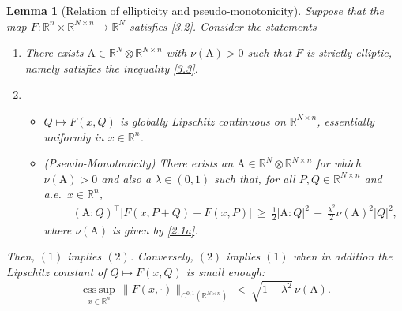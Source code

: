 \documentclass{amsart}
\newtheorem{lemma}[theorem]{Lemma}
\theoremstyle{definition}
\numberwithin{equation}{section}
\begin{document}
\begin{lemma}[Relation of ellipticity and pseudo-monotonicity] \label{pr1} Suppose that the map $F : {\mathbb{R}}^n {\times} {\mathbb{R}}^{N{\times} n}{\longrightarrow} {\mathbb{R}}^N$ satisfies \eqref{3.2}.
Consider the statements
\begin{enumerate}

\item There exists ${\textrm{A}} \in {\mathbb{R}}^N {\otimes} {\mathbb{R}}^{N{\times} n}$ with $\nu({\textrm{A}})>0$ such that $F$ is strictly elliptic, namely satisfies the inequality \eqref{3.3}.

{\medskip}

\item \begin{itemize}
         \item $Q\mapsto F(x,Q)$ is globally Lipschitz continuous on ${\mathbb{R}}^{N{\times} n}$, essentially uniformly in $x\in {\mathbb{R}}^n$.
         
         \item \emph{(Pseudo-Monotonicity)} There exists an ${\textrm{A}} \in {\mathbb{R}}^N {\otimes} {\mathbb{R}}^{N{\times} n}$ for which $\nu({\textrm{A}})>0$ and also a ${\lambda}\in(0,1)$ such that, for all $P,Q \in {\mathbb{R}}^{N {\times} n}$ and a.e.\ $x\in {\mathbb{R}}^n$, 
          \begin{align} \label{3.8}
       \ \ \ \  \ \ \ \ \  ({\textrm{A}}:Q)^\top\Big[F(x,P+Q) - F(x,P) \Big]\ \geq  \ \frac{1}{2}|{\textrm{A}}:Q|^2\, -\, \frac{{\lambda}^2}{2}\nu({\textrm{A}})^2|Q|^2,
            \end{align}
where $\nu({\textrm{A}})$ is given by \eqref{2.1a}.
        \end{itemize}

\end{enumerate}
{\medskip}

Then, $(1)$ implies $(2)$. Conversely, $(2)$ implies $(1)$ when in addition the Lipschitz constant of $Q\mapsto F(x,Q)$ is small enough:
\begin{equation}  \label{3.8a}
\underset{x\in {\mathbb{R}}^n}{{\textrm{ess}}\, \sup}\, \big\|F(x,\cdot)\|_{C^{0,1}({\mathbb{R}}^{N{\times} n})}\ <\ \sqrt{1-{\lambda}^2}\, \nu({\textrm{A}}).
\end{equation}
\end{lemma}
\end{document}
